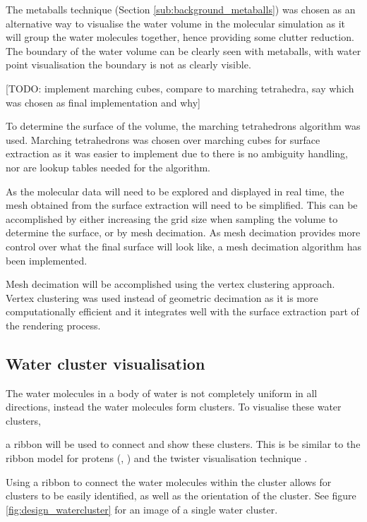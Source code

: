 The metaballs technique (Section \ref{sub:background_metaballs}) was chosen as
an alternative way to visualise the water volume in the molecular simulation as
it will group the water molecules together, hence providing some clutter
reduction. The boundary of the water volume can be clearly seen with metaballs,
with water point visualisation the boundary is not as clearly visible.

[TODO: implement marching cubes, compare to marching tetrahedra, say which was
chosen as final implementation and why]

To determine the surface of the volume, the marching tetrahedrons algorithm was
used. Marching tetrahedrons was chosen over marching cubes for surface
extraction as it was easier to implement due to there is no ambiguity handling,
nor are lookup tables needed for the algorithm.

As the molecular data will need to be explored and displayed in real time, the
mesh obtained from the surface extraction will need to be simplified. This can
be accomplished by either increasing the grid size when sampling the volume to
determine the surface, or by mesh decimation. As mesh decimation provides more
control over what the final surface will look like, a mesh decimation algorithm
has been implemented.

Mesh decimation will be accomplished using the vertex clustering approach.
Vertex clustering was used instead of geometric decimation as it is more
computationally efficient and it integrates well with the surface extraction
part of the rendering process.


\subsection{Water cluster visualisation}
\label{sub:design_watercluster}

The water molecules in a body of water is not completely uniform in all
directions, instead the water molecules form clusters. To visualise these water
clusters,

a ribbon will be used to connect and show these clusters. This is
be similar to the ribbon model for protens (\citep{richardson81},
\citep{carson87}) and the twister visualisation technique \citep{kuttel06}.

Using a ribbon to connect the water molecules within the cluster allows for
clusters to be easily identified, as well as the orientation of the cluster.
See figure \ref{fig:design_watercluster} for an image of a single water cluster.

